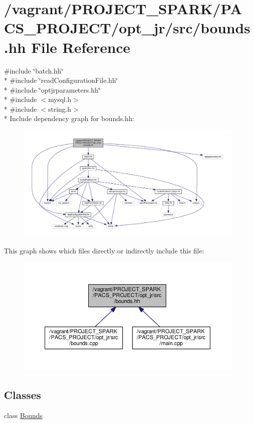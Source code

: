 \hypertarget{bounds_8hh}{\section{/vagrant/\-P\-R\-O\-J\-E\-C\-T\-\_\-\-S\-P\-A\-R\-K/\-P\-A\-C\-S\-\_\-\-P\-R\-O\-J\-E\-C\-T/opt\-\_\-jr/src/bounds.hh File Reference}
\label{bounds_8hh}
}
{\ttfamily \#include \char`\"{}batch.\-hh\char`\"{}}\\*
{\ttfamily \#include \char`\"{}read\-Configuration\-File.\-hh\char`\"{}}\\*
{\ttfamily \#include \char`\"{}optjrparameters.\-hh\char`\"{}}\\*
{\ttfamily \#include $<$mysql.\-h$>$}\\*
{\ttfamily \#include $<$string.\-h$>$}\\*
Include dependency graph for bounds.\-hh\-:
\nopagebreak
\begin{figure}[H]
\begin{center}
\leavevmode
\includegraphics[width=350pt]{bounds_8hh__incl}
\end{center}
\end{figure}
This graph shows which files directly or indirectly include this file\-:\nopagebreak
\begin{figure}[H]
\begin{center}
\leavevmode
\includegraphics[width=350pt]{bounds_8hh__dep__incl}
\end{center}
\end{figure}
\subsection*{Classes}
\begin{DoxyCompactItemize}
\item 
class \hyperlink{classBounds}{Bounds}
\end{DoxyCompactItemize}
